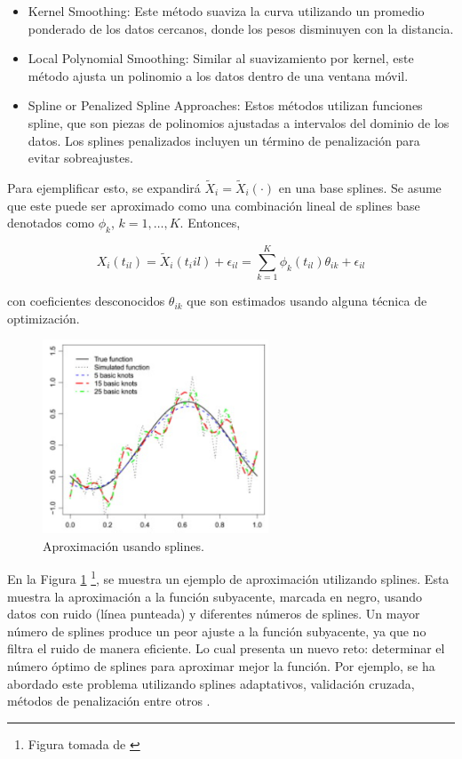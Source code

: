 \begin{itemize}
    \item Kernel Smoothing: Este método suaviza la curva utilizando un promedio ponderado de los datos cercanos, donde los pesos disminuyen con la distancia.

    \item Local Polynomial Smoothing: Similar al suavizamiento por kernel, este método ajusta un polinomio a los datos dentro de una ventana móvil. 

    \item Spline or Penalized Spline Approaches: Estos métodos utilizan funciones spline, que son piezas de polinomios ajustadas a intervalos del dominio de los datos. Los splines penalizados incluyen un término de penalización para evitar sobreajustes.
\end{itemize}

Para ejemplificar esto, se expandirá $\widetilde{X}_i = \widetilde{X}_i(\cdot)$ en una base splines. Se asume que este puede ser aproximado como una combinación lineal de splines base denotados como $\phi_{k}$, $k = 1, \dots, K$. Entonces,

\begin{equation}
     X_i(t_{il}) = \widetilde{X}_i(t_i{il}) + \epsilon_{il} = \sum_{k = 1}^{K}\phi_k(t_{il})\theta_{ik} + \epsilon_{il}
\end{equation}

con coeficientes desconocidos $\theta_{ik}$ que son estimados usando alguna técnica de optimización. 

\begin{figure}[H]
    \centering
    \includegraphics[width = 0.6\textwidth ]{Imagenes/splineEj.png}
    \caption{Aproximación usando splines.}
    \label{fig:ejSpline}
\end{figure}


En la Figura \ref{fig:ejSpline} \footnote{Figura tomada de \cite{Aguilera2013}}, se muestra un ejemplo de aproximación utilizando splines. Esta muestra la aproximación a la función subyacente, marcada en negro, usando datos con ruido (línea punteada) y diferentes números de splines. Un mayor número de splines produce un peor ajuste a la función subyacente, ya que no filtra el ruido de manera eficiente. Lo cual presenta un nuevo reto: determinar el número óptimo de splines para aproximar mejor la función. Por ejemplo, se ha abordado este problema utilizando splines adaptativos, validación cruzada, métodos de penalización entre otros \cite{Aguilera2013}.


